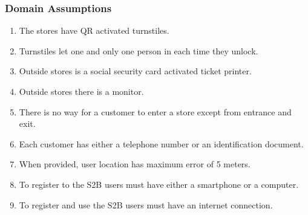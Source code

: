 \subsubsection{Domain Assumptions}
\begin{enumerate}[label=D\arabic*]
	\item The stores have QR activated turnstiles.
	\item Turnstiles let one and only one person in each time they unlock.
	\item Outside stores is a social security card activated ticket printer.
	\item Outside stores there is a monitor.
	\item There is no way for a customer to enter a store except from entrance and exit.
	\item Each customer has either a telephone number or an identification document.
	\item When provided, user location has maximum error of 5 meters.
	\item To register to the S2B users must have either a smartphone or a computer.
	\item To register and use the S2B users must have an internet connection.
\end{enumerate}